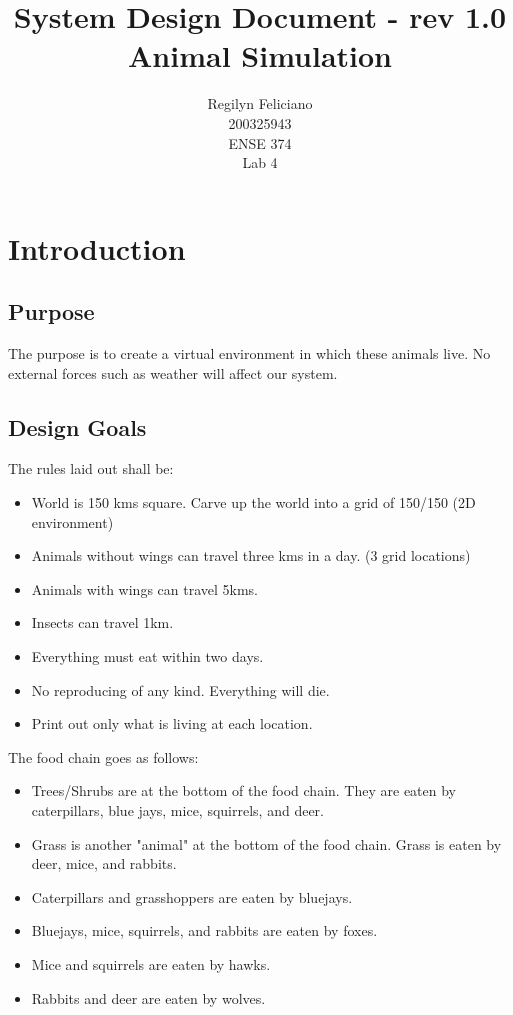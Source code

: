 \documentclass[11pt]{article}
\title{System Design Document - rev 1.0\\
 Animal Simulation}
\author{Regilyn Feliciano\\
200325943\\
ENSE 374\\
Lab 4}
\begin{document}
         
\maketitle

\section{Introduction}
\subsection{Purpose}
The purpose is to create a virtual environment in which these animals live.  No external forces such as weather will affect our system.
\subsection{Design Goals}
The rules laid out shall be:
\begin{itemize}
  \item World is 150 kms square.  Carve up the world into a grid of 150/150 (2D environment)
  \item Animals without wings can travel three kms in a day. (3 grid locations)
  \item Animals with wings can travel 5kms. 
  \item Insects can travel 1km.
  \item Everything must eat within two days.
  \item No reproducing of any kind.  Everything will die.
  \item Print out only what is living at each location.
\end{itemize}
The food chain goes as follows:
\begin{itemize}
\item Trees/Shrubs are at the bottom of the food chain. They are eaten by caterpillars, blue jays, mice, squirrels, and deer.
\item Grass is another "animal" at the bottom of the food chain. Grass is eaten by deer, mice, and rabbits.
\item Caterpillars and grasshoppers are eaten by bluejays.
\item Bluejays, mice, squirrels, and rabbits are eaten by foxes.
\item Mice and squirrels are eaten by hawks.
\item Rabbits and deer are eaten by wolves.
\end{itemize}
\end{document}
